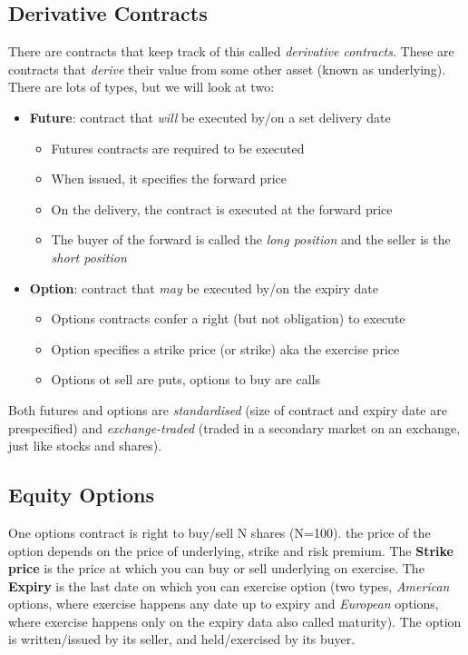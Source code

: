 \documentclass[11pt,a4paper,titlepage,dvipsnames,cmyk]{scrartcl}
\begin{document}
\subsection{Derivative Contracts}
There are contracts that keep track of this called \textit{derivative contracts}. These are contracts that \textit{derive} their value from some other asset (known as underlying). There are lots of types, but we will look at two:
\begin{itemize}
    \item \textbf{Future}: contract that \textit{will} be executed by/on a set delivery date
    \begin{itemize}
        \item Futures contracts are required to be executed
        \item When issued, it specifies the forward price
        \item On the delivery, the contract is executed at the forward price
        \item The buyer of the forward is called the \textit{long position} and the seller is the \textit{short position}
    \end{itemize}
    \item \textbf{Option}: contract that \textit{may} be executed by/on the expiry date
    \begin{itemize}
        \item Options contracts confer a right (but not obligation) to execute
        \item Option specifies a strike price (or strike) aka the exercise price
        \item Options ot sell are puts, options to buy are calls
    \end{itemize}
\end{itemize}

Both futures and options are \textit{standardised} (size of contract and expiry date are prespecified) and \textit{exchange-traded} (traded in a secondary market on an exchange, just like stocks and shares).

\subsection{Equity Options}
One options contract is right to buy/sell N shares (N=100). the price of the option depends on the price of underlying, strike and risk premium. The \textbf{Strike price} is the price at which you can buy or sell underlying on exercise. The \textbf{Expiry} is the last date on which you can exercise option (two types, \textit{American} options, where exercise happens any date up to expiry and \textit{European} options, where exercise happens only on the expiry data also called maturity). The option is written/issued by its seller, and held/exercised by its buyer.
\end{document}
